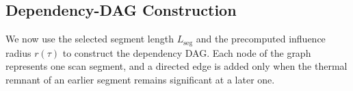 \documentclass[conference]{IEEEtran}
\begin{document}



\subsection{Dependency-DAG Construction}
\label{seq:dag}

We now use the selected segment length $L_{\mathrm{seg}}$ and the precomputed influence radius $r(\tau)$ to construct the dependency DAG. Each node of the graph represents one scan segment, and a directed edge is added only when the thermal remnant of an earlier segment remains significant at a later one.
\end{document}

